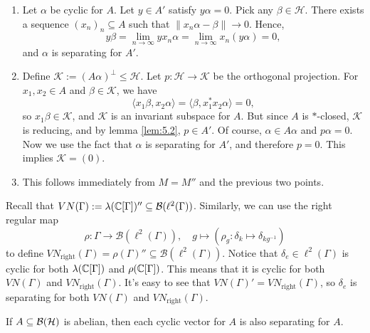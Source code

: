 \begin{myproof}
  \begin{enumerate}
    \item Let $\alpha$ be cyclic for $A$. Let $y \in A'$ satisfy $y \alpha = 0$.
    Pick any $\beta \in \mathcal{H}$. There exists a sequence $(x_n)_n \subseteq A$ such that $\|x_n \alpha - \beta\| \to 0$.
    Hence, $$y \beta = \lim_{n \to \infty} yx_n \alpha = \lim_{n \to \infty} x_n (y\alpha) = 0,$$
    and $\alpha$ is separating for $A'$.
    \item Define $\mathcal{K} := (A \alpha)^{\perp} \leq \mathcal{H}$.
    Let $p: \mathcal{H} \to \mathcal{K}$ be the orthogonal projection.
    For $x_1, x_2 \in A$ and $\beta \in \mathcal{K}$, we have 
    $$\langle x_1 \beta, x_2 \alpha\rangle = \langle \beta, x_1 ^* x_2 \alpha \rangle = 0,$$
    so $x_1 \beta \in \mathcal{K}$, and $\mathcal{K}$ is an invariant subspace for $A$.
    But since $A$ is $*$-closed, $\mathcal{K}$ is reducing, and by lemma \ref{lem:5.2}, $p \in A'$.
    Of course, $\alpha \in A \alpha$ and $p\alpha = 0$. Now we use the fact that $\alpha$ is 
    separating for $A'$, and therefore $p = 0$. This implies $\mathcal{K} = (0)$.
    \item This follows immediately from $M = M''$ and the previous two points. \qedhere
  \end{enumerate}
\end{myproof}

\begin{example}
  Recall that $VN (\Gamma) := \lambda (\mathbb {C} [\Gamma])'' \subseteq \mathcal{B} (\ell^2 (\Gamma))$.
  Similarly, we can use the right regular map 
  $$\rho: \Gamma \to \mathcal{B} (\ell^2 (\Gamma)),\quad g \mapsto (\rho_g: \delta_k \mapsto \delta_{kg^{-1}})$$
  to define $VN_{\mathrm{right}} (\Gamma) = \rho(\Gamma)'' \subseteq \mathcal{B} (\ell^2 (\Gamma))$.
  Notice that $\delta_e \in \ell^2 (\Gamma)$ is cyclic for both $\lambda (\mathbb {C} [\Gamma])$ and $\rho(\mathbb {C}[\Gamma])$.
  This means that it is cyclic for both $VN(\Gamma)$ and $VN_{\mathrm{right}} (\Gamma)$.
  It's easy to see that $VN(\Gamma)' = VN_{\mathrm{right}} (\Gamma)$, so $\delta_e$
  is separating for both $VN(\Gamma)$ and $VN_{\mathrm{right}} (\Gamma)$.
\end{example}

\begin{corollary}
  If $A \subseteq \operatorname{\mathcal{B} (\mathcal{H})}$ is abelian, then each cyclic vector for $A$ is also separating for $A$.
\end{corollary}

